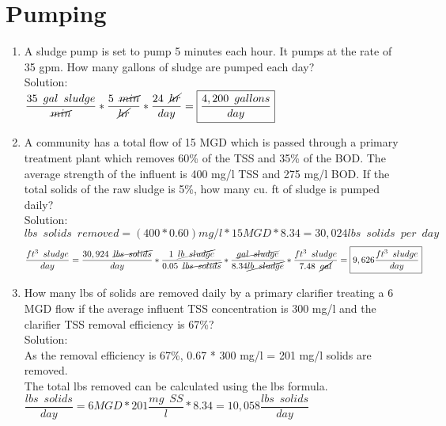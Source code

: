 \section{Pumping}
\begin{enumerate}
\item A sludge pump is set to pump 5 minutes each hour. It pumps at the rate of 35 gpm. How many gallons of sludge are pumped each day?\\
Solution:\\
$\dfrac{35 \enspace gal \enspace sludge}{\cancel{min}}*\dfrac{5 \enspace \cancel{min}}{\cancel{hr}} *\dfrac{24 \enspace \cancel{hr}}{day}=\boxed{\dfrac{4,200 \enspace gallons}{day}}$\\

\item A community has a total flow of 15 MGD which is passed through a primary treatment plant which removes 60\% of the TSS and 35\% of the BOD. The average strength of the influent is 400 mg/l TSS and 275 mg/l BOD. If the total solids of the raw sludge is 5\%, how many cu. ft of sludge is pumped daily?\\
Solution:\\
$lbs \enspace solids \enspace removed=(400*0.60)mg/l*15MGD*8.34=30,024lbs \enspace solids \enspace per \enspace day$
$$\dfrac{ft^3\enspace sludge}{day}= \dfrac{30,924 \enspace \cancel{lbs \enspace solids}}{day} * \dfrac{1 \enspace \cancel{lb \enspace sludge}}{0.05\enspace \cancel{lbs \enspace solids}}*\dfrac{\cancel{gal \enspace sludge}}{8.34\cancel{lb \enspace sludge}}*\dfrac{ft^3 \enspace sludge}{7.48 \enspace \cancel{gal}}=\boxed{9,626\dfrac{ft^3 \enspace sludge}{day}} $$

\item How many lbs of solids are removed daily by a primary clarifier treating a 6 MGD flow if the average influent TSS concentration is 300 mg/l and the clarifier TSS removal efficiency is 67\%?\\
Solution:\\
As the removal efficiency is 67\%, 0.67 * 300 mg/l = 201 mg/l solids are removed.\\
The total lbs removed can be calculated using the lbs formula.\\
$ \dfrac{lbs \enspace solids}{day}= 6 MGD* 201  \dfrac{mg \enspace  SS}{l}*8.34=\boxed{10,058 \dfrac{lbs \enspace solids}{day}}$
\end{enumerate}
